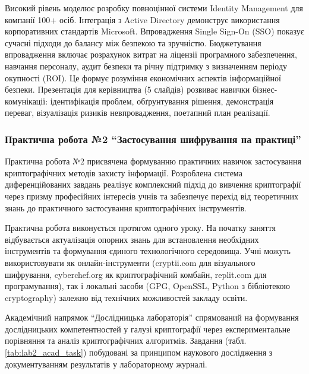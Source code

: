 Високий рівень моделює розробку повноцінної системи Identity Management для компанії 100+ осіб. Інтеграція з Active Directory демонструє використання корпоративних стандартів Microsoft. Впровадження Single Sign-On (SSO) показує сучасні підходи до балансу між безпекою та зручністю.
Бюджетування впровадження включає розрахунок витрат на ліцензії програмного забезпечення, навчання персоналу, аудит безпеки та річну підтримку з визначенням періоду окупності (ROI). Це формує розуміння економічних аспектів інформаційної безпеки.
Презентація для керівництва (5 слайдів) розвиває навички бізнес-комунікації: ідентифікація проблем, обґрунтування рішення, демонстрація переваг, візуалізація ризиків невпровадження, поетапний план реалізації. 



\subsubsection{Практична робота №2 ``Застосування шифрування на практиці''}

Практична робота №2 присвячена формуванню практичних навичок застосування криптографічних методів захисту інформації. Розроблена система диференційованих завдань реалізує комплексний підхід до вивчення криптографії через призму професійних інтересів учнів та забезпечує перехід від теоретичних знань до практичного застосування криптографічних інструментів.

Практична робота виконується протягом одного уроку. На початку заняття відбувається актуалізація опорних знань для встановлення необхідних інструментів та формування єдиного технологічного середовища. Учні можуть використовувати як онлайн-інструменти (cryptii.com для візуального шифрування, cyberchef.org як криптографічний комбайн, replit.com для програмування), так і локальні засоби (GPG, OpenSSL, Python з бібліотекою cryptography) залежно від технічних можливостей закладу освіти.

Академічний напрямок ``Дослідницька лабораторія'' спрямований на формування дослідницьких компетентностей у галузі криптографії через експериментальне порівняння та аналіз криптографічних алгоритмів. Завдання (табл. \ref{tab:lab2_acad_task})  побудовані за принципом наукового дослідження з документуванням результатів у лабораторному журналі.




